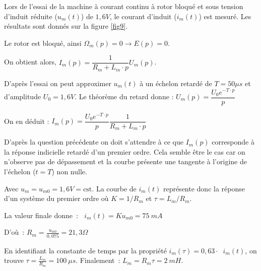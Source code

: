 Lors de l'essai de la machine à courant continu à rotor bloqué et sous tension d'induit réduite ($u_m(t)$) de $1,6 V$, le courant d'induit ($i_m(t)$) est mesuré. Les résultats sont donnés sur la figure \ref{fig9}.

\ifprof
\begin{corrige}
Le rotor est bloqué, ainsi $\Omega_m(p)=0\rightarrow E(p)=0$.

On obtient alors, $I_m(p)=\dfrac{1}{R_m+L_m\cdot p}U_m(p)$.

\end{corrige}
\else
\fi

\ifprof
\begin{corrige}
D'après l'essai on peut approximer $u_m(t)$ à un échelon retardé de $T=50\mu s$ et d'amplitude $U_0=1,6V$.
Le théorème du retard donne :  $U_m(p)=\dfrac{U_0e^{-T\cdot p}}{p}$

On en déduit : 
$I_m(p)=\dfrac{U_0e^{-T\cdot p}}{p}\dfrac{1}{R_m+L_m\cdot p}$

\end{corrige}
\else
\fi


\ifprof
\begin{corrige}
D'après la question précédente on doit s'attendre à ce que $I_m(p)$ corresponde à la réponse indicielle retardé d'un premier ordre. Cela semble être le cas car on n'observe pas de dépassement et la courbe présente une tangente à l'origine de l'échelon ($t=T$) non nulle.

\end{corrige}
\else
\fi


\ifprof
\begin{corrige}
Avec \(u_{m} = u_{m0} = 1,6V = \text{cst}\). La courbe de \(i_{m}(t)\) représente donc la réponse d'un système du premier ordre où
\(K = 1/R_{m}\) et \(\tau = L_{m}/R_{m}\).

La valeur finale donne~: 
\(\operatorname{}{i_{m}(t)} = Ku_{m0} = \SI{75}{mA}\)

D'où~: \(R_{m} = \frac{u_{m0}}{0,075} = 21,3\Omega\)

En identifiant la constante de temps par la propriété \(i_{m}\left( \tau \right) = 0,63 \cdot \operatorname{}{i_{m}(t)}\), on
trouve \(\tau = \frac{L_{m}}{R_{m}} =\SI{100}{\mu s}\). Finalement~:
\(L_{m} = R_{m}\tau = \SI{2}{mH}\).
\end{corrige}
\else
\fi

